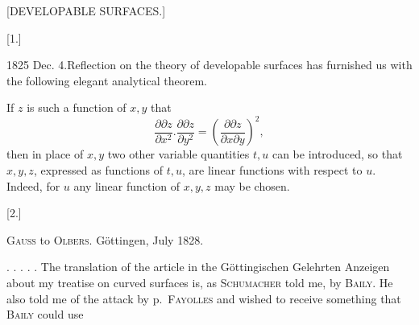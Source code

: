 \clearpage
{}
\begin{center}\large [DEVELOPABLE SURFACES.]\end{center}
\begin{center}[1.]\end{center}
\noindent\hspace*{1.2em}1825 Dec. 4.\quad Reflection on the theory of developable surfaces has furnished us with the following elegant analytical theorem.

If $z$ is such a function of $x,y$ that
\[
\frac{\partial\partial z}{\partial x^2}.\frac{\partial\partial z}{\partial y^2}
=\left(\frac{\partial\partial z}{\partial x\partial y}\right)^2,
\]
\noindent then in place of $x,y$ two other variable quantities $t,u$ can be introduced, so that $x,y,z$, expressed as functions of $t,u$, are linear functions with respect to $u$. Indeed, for $u$ any linear function of $x,y,z$ may be chosen.

\begin{center}[2.]\end{center}
\begin{center}\textsc{Gauss} to \textsc{Olbers}. Göttingen, July 1828.\end{center}
\noindent\hspace*{1.2em}. . . . . The translation of the article in the Göttingischen Gelehrten Anzeigen about my treatise on curved surfaces is, as \textsc{Schumacher} told me, by \textsc{Baily}. He also told me of the attack by p.\ \textsc{Fayolles} and wished to receive something that \textsc{Baily} could use
